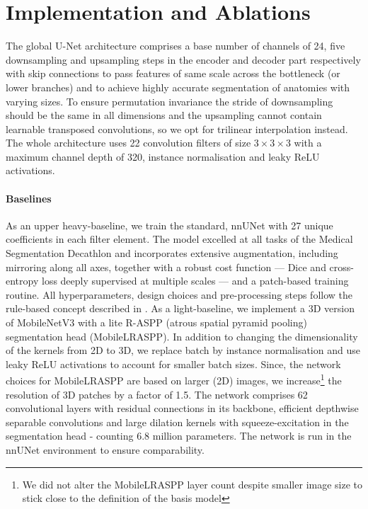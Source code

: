 \section{Implementation and Ablations}
    The global U-Net architecture comprises a base number of channels of 24, five downsampling and upsampling steps in the encoder and decoder part respectively with skip connections to pass features of same scale across the bottleneck (or lower branches) and to achieve highly accurate segmentation of anatomies with varying sizes. To ensure permutation invariance the stride of downsampling should be the same in all dimensions and the upsampling cannot contain learnable transposed convolutions, so we opt for trilinear interpolation instead. The whole architecture uses 22 convolution filters of size $3\times3\times3$ with a maximum channel depth of 320, instance normalisation and leaky ReLU activations.

    \vspace{-6pt}\paragraph{Baselines} As an upper heavy-baseline, we train the standard, nnUNet with 27 unique coefficients in each filter element. The model excelled at all tasks of the Medical Segmentation Decathlon \cite{antonelli2021medical} and incorporates extensive augmentation, including mirroring along all axes, together with a robust cost function --- Dice and cross-entropy loss deeply supervised at multiple scales --- and a patch-based training routine. All hyperparameters, design choices and pre-processing steps follow the rule-based concept described in \cite{isensee2021nnu}. As a light-baseline, we implement a 3D version of MobileNetV3 \cite{howard2019searching} with a lite R-ASPP (atrous spatial pyramid pooling) segmentation head (MobileLRASPP). In addition to changing the dimensionality of the kernels from 2D to 3D, we replace batch by instance normalisation and use leaky ReLU activations to account for smaller batch sizes. Since, the network choices for MobileLRASPP are based on larger (2D) images, we increase\footnote{We did not alter the MobileLRASPP layer count despite smaller image size to stick close to the definition of the basis model} the resolution of 3D patches by a factor of 1.5. The network comprises 62 convolutional layers with residual connections in its backbone, efficient depthwise separable convolutions and large dilation kernels with squeeze-excitation in the segmentation head - counting 6.8 million parameters.
    The network is run in the nnUNet environment to ensure comparability.

